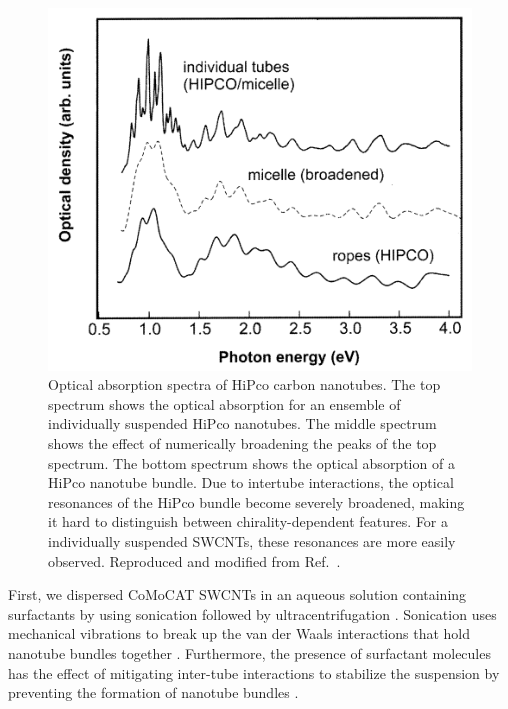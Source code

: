 \begin{figure}[H]
	\centering
	\includegraphics[scale=1.]{images/chapter_methods/cnt_rope_vs_micelle}
	\caption{Optical absorption spectra of HiPco carbon nanotubes. The top spectrum shows the optical absorption for an ensemble of individually suspended HiPco nanotubes. The middle spectrum shows the effect of numerically broadening the peaks of the top spectrum. The bottom spectrum shows the optical absorption of a HiPco nanotube bundle. Due to intertube interactions, the optical resonances of the HiPco bundle become severely broadened, making it hard to distinguish between chirality-dependent features. For a individually suspended SWCNTs, these resonances are more easily observed. Reproduced and modified from Ref.\ \cite{hagen2003quantitative}.}
	\label{fig:cnt_dispersion_vs_rope}
\end{figure}


First, we dispersed CoMoCAT SWCNTs in an aqueous solution containing surfactants by using sonication followed by ultracentrifugation \cite{liu1998fullerene, o2001reversible, o2002band}. Sonication uses mechanical vibrations to break up the van der Waals interactions that hold nanotube bundles together . Furthermore, the presence of surfactant molecules has the effect of mitigating inter-tube interactions to stabilize the suspension by preventing the formation of nanotube bundles \cite{liu1998fullerene, o2001reversible, o2002band}.

